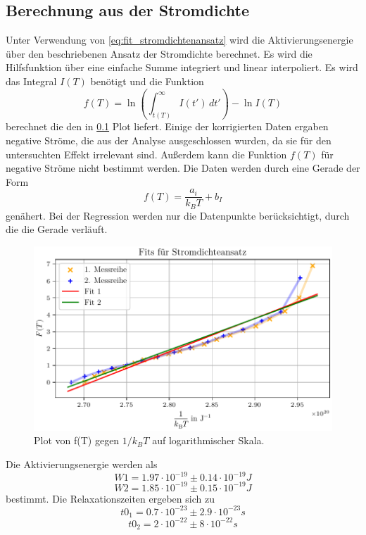 \subsection{Berechnung aus der Stromdichte}
Unter Verwendung von \ref{eq:fit_stromdichtenansatz} wird die Aktivierungsenergie über den beschriebenen Ansatz der Stromdichte 
berechnet. Es wird die Hilfsfunktion über eine einfache Summe integriert und linear interpoliert.
Es wird das Integral $I(T)$ benötigt und die Funktion 
\begin{equation}
f(T) = \ln \left( \int_{t(T)}^{\infty} I(t') \, dt' \right) - \ln I(T)
\end{equation}
berechnet die den in \ref{} Plot liefert. Einige der korrigierten Daten ergaben negative Ströme,
die aus der Analyse ausgeschlossen wurden, da sie für den untersuchten Effekt irrelevant sind.
Außerdem kann die Funktion $f(T)$ für negative Ströme nicht bestimmt werden. Die Daten werden durch eine Gerade der Form 
\begin{equation}
    f(T)=\frac{a_i}{k_BT}+b_I
\end{equation}
genähert. Bei der Regression werden nur die Datenpunkte berücksichtigt, durch die die Gerade verläuft.


\begin{figure}[H]
    \centering
    \includegraphics[width=\textwidth]{plots/H_stromdichte.pdf}
    \caption{Plot von f(T) gegen $1/k_BT$ auf logarithmischer Skala.}
    \label{fig:Stromdichteansatz}
\end{figure}

Die Aktivierungsenergie werden als 
\begin{equation}
W1   = 1.97\cdot10^{-19}\pm0.14\cdot10^{-19}J
\end{equation} 
\begin{equation}
 W2   = 1.85\cdot10^{-19}\pm0.15\cdot10^{-19}J
\end{equation} 
bestimmt.
Die Relaxationszeiten ergeben sich zu
\begin{equation}
t0_1 = 0.7\cdot10^{-23}\pm2.9\cdot10^{-23}s
\end{equation} 
\begin{equation}
t0_2 = 2\cdot10^{-22}\pm8\cdot10^{-22}s
\end{equation} 

